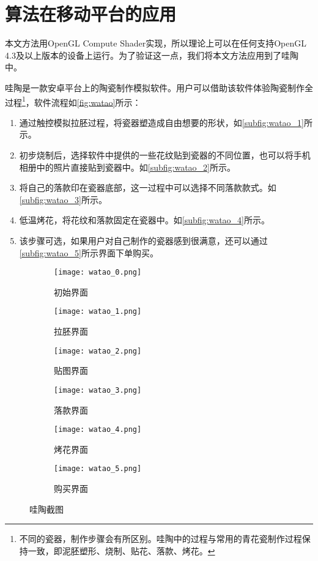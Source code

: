 \chapter{算法在移动平台的应用}
    本文方法用OpenGL Compute Shader实现，所以理论上可以在任何支持OpenGL 4.3及以上版本的设备上运行。为了验证这一点，我们将本文方法应用到了哇陶中。

    哇陶是一款安卓平台上的陶瓷制作模拟软件。用户可以借助该软件体验陶瓷制作全过程\footnote{不同的瓷器，制作步骤会有所区别。哇陶中的过程与常用的青花瓷制作过程保持一致，即泥胚塑形、烧制、贴花、落款、烤花。}，软件流程如\autoref{fig:watao}所示：
    \begin{enumerate}
        \item 通过触控模拟拉胚过程，将瓷器塑造成自由想要的形状，如\autoref{subfig:watao_1}所示。
        \item 初步烧制后，选择软件中提供的一些花纹贴到瓷器的不同位置，也可以将手机相册中的照片直接贴到瓷器中。如\autoref{subfig:watao_2}所示。
        \item 将自己的落款印在瓷器底部，这一过程中可以选择不同落款款式。如\autoref{subfig:watao_3}所示。
        \item 低温烤花，将花纹和落款固定在瓷器中。如\autoref{subfig:watao_4}所示。
        \item 该步骤可选，如果用户对自己制作的瓷器感到很满意，还可以通过\autoref{subfig:watao_5}所示界面下单购买。
    \end{enumerate}

\begin{figure}[htbp]
	\centering
	\begin{subfigure}[b]{.32\textwidth}
		\centering
		\texttt{[image: watao\_0.png]}
		\caption{初始界面}\label{subfig:watao_0}
	\end{subfigure}
	\begin{subfigure}[b]{.32\textwidth}
		\centering
		\texttt{[image: watao\_1.png]}
		\caption{拉胚界面}\label{subfig:watao_1}
	\end{subfigure}
	\begin{subfigure}[b]{.32\textwidth}
		\centering
		\texttt{[image: watao\_2.png]}
		\caption{贴图界面}\label{subfig:watao_2}
	\end{subfigure}

    \par
	\begin{subfigure}[b]{.32\textwidth}
		\centering
		\texttt{[image: watao\_3.png]}
		\caption{落款界面}\label{subfig:watao_3}
	\end{subfigure}
	\begin{subfigure}[b]{.32\textwidth}
		\centering
		\texttt{[image: watao\_4.png]}
		\caption{烤花界面}\label{subfig:watao_4}
	\end{subfigure}
	\begin{subfigure}[b]{.32\textwidth}
		\centering
		\texttt{[image: watao\_5.png]}
		\caption{购买界面}\label{subfig:watao_5}
	\end{subfigure}

	\caption{哇陶截图}\label{fig:watao}
\end{figure}

